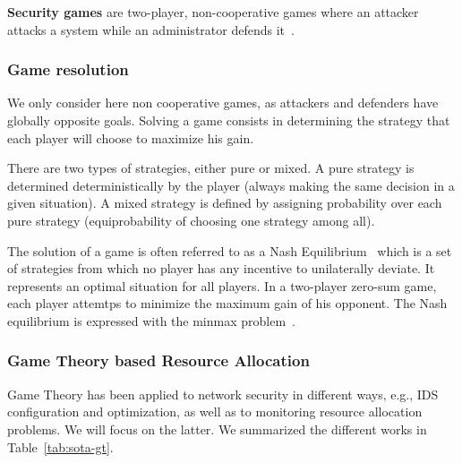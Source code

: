 \textbf{Security games} are two-player, non-cooperative games where an attacker attacks a system while an administrator defends it~\cite{book-gt}.

\subsubsection{Game resolution}
We only consider here non cooperative games, as attackers and defenders have globally opposite goals.
Solving a game consists in determining the strategy that each player will choose to maximize his gain.

There are two types of strategies, either pure or mixed.
A pure strategy is determined deterministically by the player (\ie always making the same decision in a given situation).
A mixed strategy is defined by assigning probability over each pure strategy (\eg equiprobability of choosing one strategy among all).

The solution of a game is often referred to as a Nash Equilibrium~\cite{nasheq} which is a set of strategies from which no player has any incentive to unilaterally deviate. It represents an optimal situation for all players.
In a two-player zero-sum game, each player attemtps to minimize the maximum gain of his opponent. 
The Nash equilibrium is expressed with the minmax problem~\cite{minmax}.

\subsubsection{Game Theory based Resource Allocation}
Game Theory has been applied to network security in different ways, e.g., IDS configuration and optimization, as well as to monitoring resource allocation problems. We will focus on the latter. We summarized the different works in Table~\ref{tab:sota-gt}.

